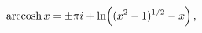 \[\mathop{\mathrm{arccosh}\/}\nolimits x=\pm\pi i+\mathop{\ln\/}\nolimits\!\left%
((x^{2}-1)^{1/2}-x\right),\]